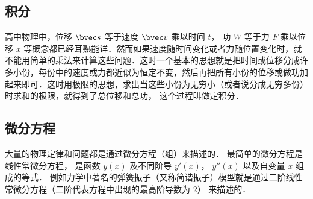 \subsection{积分}
高中物理中，位移 $\bvec s$ 等于速度 $\bvec v$ 乘以时间 $t$， 功 $W$ 等于力 $F$ 乘以位移 $x$ 等概念都已经耳熟能详．然而如果速度随时间变化或者力随位置变化时，就不能用简单的乘法来计算这些问题．这时一个基本的思想就是把时间或位移分成许多小份，每份中的速度或力都近似为恒定不变，然后再把所有小份的位移或做功加起来即可．这时用极限的思想，求出当这些小份为无穷小（或者说分成无穷多份）时求和的极限，就得到了总位移和总功， 这个过程叫做定积分． %

\subsection{微分方程}
大量的物理定律和问题都是通过微分方程（组）来描述的． 最简单的微分方程是线性常微分方程，%
是函数 $y(x)$ 及不同阶导 $y'(x)$， $y''(x)$ 以及自变量 $x$ 组成的等式． 例如力学中著名的弹簧振子（又称简谐振子）模型就是通过二阶线性常微分方程（二阶代表方程中出现的最高阶导数为 2） 来描述的．



